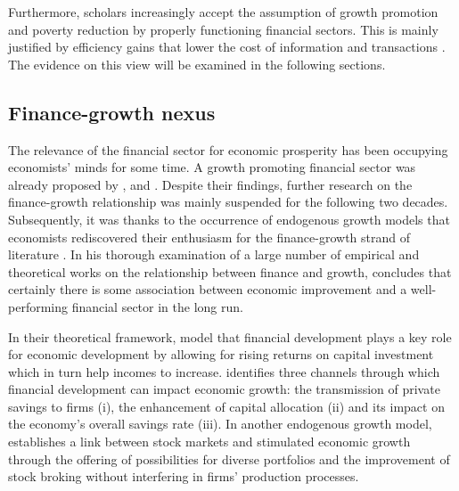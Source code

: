 \documentclass[12pt, a4paper]{article}
\begin{document}
Furthermore, scholars increasingly accept the assumption of growth promotion and poverty reduction by properly functioning financial sectors. This is mainly justified by efficiency gains that lower the cost of information and transactions \cite{king1993, bencivenga1995, beck2004a}. The evidence on this view will be examined in the following sections.


\subsection{Finance-growth nexus} \label{f-g}

The relevance of the financial sector for economic prosperity has been occupying economists' minds for some time. A growth promoting financial sector was already proposed by ,  and . Despite their findings, further research on the finance-growth relationship was mainly suspended for the following two decades. Subsequently, it was thanks to the occurrence of endogenous growth models that economists rediscovered their enthusiasm for the finance-growth strand of literature \cite{pagano1993}. In his thorough examination of a large number of empirical and theoretical works on the relationship between finance and growth,  concludes that certainly there is some association between economic improvement and a well-performing financial sector in the long run.

In their theoretical framework,  model that financial development plays a key role for economic development by allowing for rising returns on capital investment which in turn help incomes to increase.  identifies three channels through which financial development can impact economic growth: the transmission of private savings to firms (i), the enhancement of capital allocation (ii) and its impact on the economy's overall savings rate (iii). In another endogenous growth model,  establishes a link between stock markets and stimulated economic growth through the offering of possibilities for diverse portfolios and the improvement of stock broking without interfering in firms' production processes.
\end{document}
